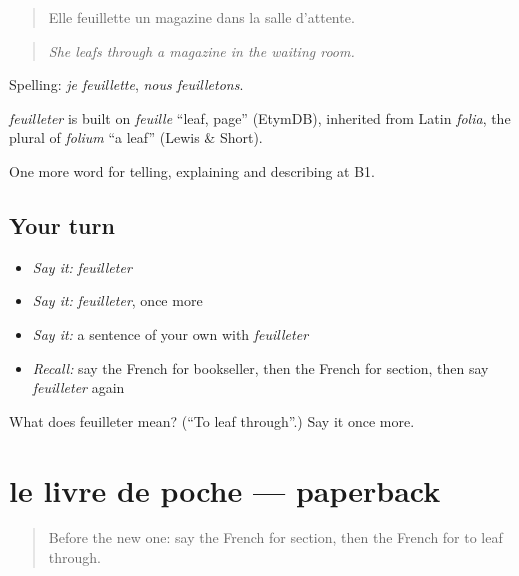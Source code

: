 \begin{quote}
Elle feuillette un magazine dans la salle d'attente.
\end{quote}

\begin{quote}
\emph{She leafs through a magazine in the waiting room.}
\end{quote}

Spelling: \emph{je feuillette}, \emph{nous feuilletons}.

\begin{cousinweb}
\emph{feuilleter} is built on \emph{feuille} \textquotedblleft{}leaf, page\textquotedblright{} (EtymDB), inherited from Latin \emph{folia}, the plural of \emph{folium} \textquotedblleft{}a leaf\textquotedblright{} (Lewis \& Short).
\end{cousinweb}

\begin{grammarlens}[title={What you've built}]
One more word for telling, explaining and describing at B1.
\end{grammarlens}

\subsection*{Your turn}
\begin{itemize}
\raggedright
  \item \emph{Say it:} \emph{feuilleter}
  \item \emph{Say it:} \emph{feuilleter}, once more
  \item \emph{Say it:} a sentence of your own with \emph{feuilleter}
  \item \emph{Recall:} say the French for bookseller, then the French for section, then say \emph{feuilleter} again
\end{itemize}

\begin{tcolorbox}[breakable,colback=teal!4,colframe=teal!35!black,title={Before you move on}]
What does feuilleter mean? (\textquotedblleft{}To leaf through\textquotedblright{}.) Say it once more.
\end{tcolorbox}
\section[le livre de poche]{le livre de poche — paperback}

\label{lesson:FR-C520-livre-de-poche}



\begin{quote}
Before the new one: say the French for section, then the French for to leaf through.
\end{quote}

